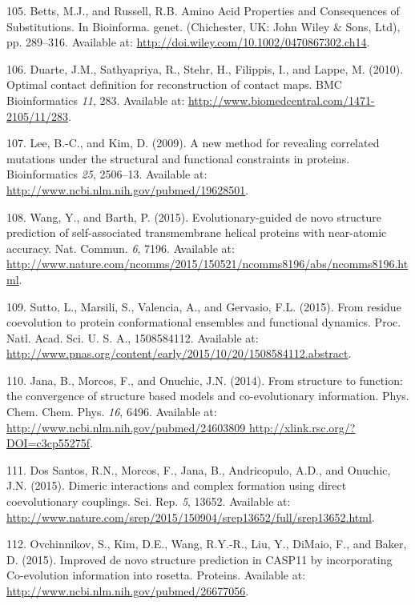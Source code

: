 \documentclass[12pt,a4paper,twoside]{book}
\theoremstyle{definition}
\theoremstyle{definition}
\theoremstyle{remark}
\begin{document}
\hypertarget{ref-Bettsa}{}
105. Betts, M.J., and Russell, R.B. Amino Acid Properties and
Consequences of Substitutions. In Bioinforma. genet. (Chichester, UK:
John Wiley \& Sons, Ltd), pp. 289--316. Available at:
\url{http://doi.wiley.com/10.1002/0470867302.ch14}.

\hypertarget{ref-Duarte2010}{}
106. Duarte, J.M., Sathyapriya, R., Stehr, H., Filippis, I., and Lappe,
M. (2010). Optimal contact definition for reconstruction of contact
maps. BMC Bioinformatics \emph{11}, 283. Available at:
\url{http://www.biomedcentral.com/1471-2105/11/283}.

\hypertarget{ref-Lee2009}{}
107. Lee, B.-C., and Kim, D. (2009). A new method for revealing
correlated mutations under the structural and functional constraints in
proteins. Bioinformatics \emph{25}, 2506--13. Available at:
\url{http://www.ncbi.nlm.nih.gov/pubmed/19628501}.

\hypertarget{ref-Wang2015}{}
108. Wang, Y., and Barth, P. (2015). Evolutionary-guided de novo
structure prediction of self-associated transmembrane helical proteins
with near-atomic accuracy. Nat. Commun. \emph{6}, 7196. Available at:
\url{http://www.nature.com/ncomms/2015/150521/ncomms8196/abs/ncomms8196.html}.

\hypertarget{ref-Sutto2015}{}
109. Sutto, L., Marsili, S., Valencia, A., and Gervasio, F.L. (2015).
From residue coevolution to protein conformational ensembles and
functional dynamics. Proc. Natl. Acad. Sci. U. S. A., 1508584112.
Available at:
\url{http://www.pnas.org/content/early/2015/10/20/1508584112.abstract}.

\hypertarget{ref-Jana2014}{}
110. Jana, B., Morcos, F., and Onuchic, J.N. (2014). From structure to
function: the convergence of structure based models and co-evolutionary
information. Phys. Chem. Chem. Phys. \emph{16}, 6496. Available at:
\href{http://www.ncbi.nlm.nih.gov/pubmed/24603809\%20http://xlink.rsc.org/?DOI=c3cp55275f}{http://www.ncbi.nlm.nih.gov/pubmed/24603809 http://xlink.rsc.org/?DOI=c3cp55275f}.

\hypertarget{ref-DosSantos2015a}{}
111. Dos Santos, R.N., Morcos, F., Jana, B., Andricopulo, A.D., and
Onuchic, J.N. (2015). Dimeric interactions and complex formation using
direct coevolutionary couplings. Sci. Rep. \emph{5}, 13652. Available
at:
\url{http://www.nature.com/srep/2015/150904/srep13652/full/srep13652.html}.

\hypertarget{ref-Ovchinnikov2015b}{}
112. Ovchinnikov, S., Kim, D.E., Wang, R.Y.-R., Liu, Y., DiMaio, F., and
Baker, D. (2015). Improved de novo structure prediction in CASP11 by
incorporating Co-evolution information into rosetta. Proteins. Available
at: \url{http://www.ncbi.nlm.nih.gov/pubmed/26677056}.
\end{document}
